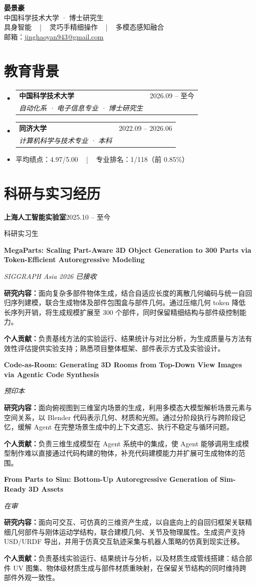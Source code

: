 \documentclass[a4paper,11pt]{article}
\makeatletter
\newcommand{\resumeSubheading}[4]{
  \vspace{-2pt}\item
    \begin{tabular*}{0.97\textwidth}[t]{l@{\extracolsep{\fill}}r}
      \textbf{#1} & #2 \\
      \textit{\small#3} & \textit{\small #4} \\
    \end{tabular*}\vspace{-1pt}
}
\newcommand{\resumeSubHeadingListStart}{\begin{itemize}[leftmargin=0.15in,label={},topsep=2pt,itemsep=2pt,parsep=0pt]}
\newcommand{\resumeSubHeadingListEnd}{\end{itemize}}
\newcommand{\researchEntry}[4]{%
  \par\addvspace{10pt}\noindent
  {\normalsize\bfseries #1\par}\nopagebreak
  {\footnotesize\itshape #2\par}\nopagebreak\vspace{2pt}
  {\small\noindent\textbf{研究内容：}#3\par}\nopagebreak\vspace{2pt}
  {\small\noindent\textbf{个人贡献：}#4\par}
}
\makeatother
\begin{document}
\begin{center}
\textbf{\Huge 晏景豪} \\[3pt]
\small 中国科学技术大学 · 博士研究生 \\[2pt]
\small 具身智能   |   灵巧手精细操作   |   多模态感知融合 \\[2pt]
\small 邮箱：\href{mailto:jinghaoyan943@gmail.com}{jinghaoyan943@gmail.com} \\[2pt]
\end{center}

\section{教育背景}
\resumeSubHeadingListStart
\resumeSubheading{中国科学技术大学}{2026.09 -- 至今}{自动化系 · 电子信息专业 · 博士研究生}{}
\resumeSubHeadingListEnd
\resumeSubHeadingListStart
\resumeSubheading{同济大学}{2022.09 -- 2026.06}{计算机科学与技术专业 · 本科}{}
\item\small 平均绩点：4.97/5.00   |   专业排名：1/118（前 0.85\%）
\resumeSubHeadingListEnd

\section{科研与实习经历}
\noindent\textbf{上海人工智能实验室}\hfill 2025.10 -- 至今\par
{\small 科研实习生\par}
\researchEntry{MegaParts: Scaling Part-Aware 3D Object Generation to 300 Parts via Token-Efficient Autoregressive Modeling}{SIGGRAPH Asia 2026 已接收}{面向复杂多部件物体生成，结合自适应长度的离散几何编码与统一自回归序列建模，联合生成物体及部件包围盒与部件几何。通过压缩几何 token 降低长序列开销，将生成规模扩展至 300 个部件，同时保留精细结构与部件级控制能力。}{负责基线方法的实验运行、结果统计与对比分析，为生成质量与方法有效性评估提供实验支持；熟悉项目整体框架、部件表示方式及实验设计。}
\researchEntry{Code-as-Room: Generating 3D Rooms from Top-Down View Images via Agentic Code Synthesis}{预印本}{面向俯视图到三维室内场景的生成，利用多模态大模型解析场景元素与空间关系，以 Blender 代码表示几何、材质和光照。通过分阶段执行与跨阶段记忆，缓解 Agent 在完整场景生成中的上下文遗忘、执行不稳定与循环问题。}{负责三维生成模型在 Agent 系统中的集成，使 Agent 能够调用生成模型制作难以直接通过代码构建的物体，补充代码建模能力并扩展可生成物体的范围。}
\researchEntry{From Parts to Sim: Bottom-Up Autoregressive Generation of Sim-Ready 3D Assets}{在审}{面向可交互、可仿真的三维资产生成，以自底向上的自回归框架关联精细几何部件与刚体运动学结构，联合建模几何、关节及物理属性。生成资产支持 USD/URDF 导出，并用于仿真交互轨迹采集与机器人策略的仿真到现实迁移。}{负责基线实验运行、结果统计与分析，以及材质生成管线搭建：结合部件 UV 图集、物体级材质生成与部件材质重映射，在保留关节结构的同时维持跨部件外观一致性。}
\end{document}
